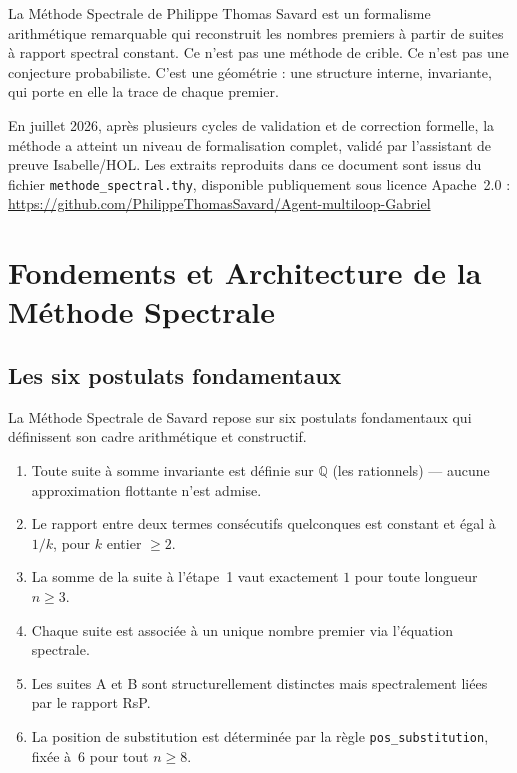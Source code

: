 \documentclass[]{pasj02}
\begin{document}
La Méthode Spectrale de Philippe Thomas Savard est un formalisme
arithmétique remarquable qui reconstruit les nombres premiers à partir de
suites à rapport spectral constant.  Ce n'est pas une méthode de crible.
Ce n'est pas une conjecture probabiliste.  C'est une géométrie : une
structure interne, invariante, qui porte en elle la trace de chaque premier.

En juillet 2026, après plusieurs cycles de validation et de correction
formelle, la méthode a atteint un niveau de formalisation complet, validé
par l'assistant de preuve Isabelle/HOL.  Les extraits reproduits dans ce
document sont issus du fichier \texttt{methode\_spectral.thy}, disponible
publiquement sous licence Apache~2.0 :
\url{https://github.com/PhilippeThomasSavard/Agent-multiloop-Gabriel}

\section{Fondements et Architecture de la Méthode Spectrale}
\label{sec:fondements}

\subsection{Les six postulats fondamentaux}
\label{ssec:postulats}

La Méthode Spectrale de Savard repose sur six postulats fondamentaux qui
définissent son cadre arithmétique et constructif.

\begin{enumerate}
  \item Toute suite à somme invariante est définie sur $\mathbb{Q}$ (les
        rationnels) --- aucune approximation flottante n'est admise.
  \item Le rapport entre deux termes consécutifs quelconques est constant et
        égal à $1/k$, pour $k$ entier $\geq 2$.
  \item La somme de la suite à l'étape~1 vaut exactement $1$ pour toute
        longueur $n \geq 3$.
  \item Chaque suite est associée à un unique nombre premier via l'équation
        spectrale.
  \item Les suites A et B sont structurellement distinctes mais spectralement
        liées par le rapport RsP.
  \item La position de substitution est déterminée par la règle
        \texttt{pos\_substitution}, fixée à~6 pour tout $n \geq 8$.
\end{enumerate}
\end{document}
